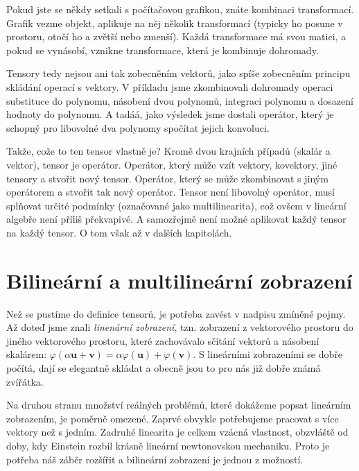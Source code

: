 \documentclass[a5paper,12pt]{amsbook}
\theoremstyle{definition}
\newcommand{\myvec}[1]{\bm{#1}}
\begin{document}
Pokud jste se někdy setkali s počítačovou grafikou, znáte kombinaci transformací. Grafik vezme objekt,
aplikuje na něj několik transformací (typicky ho posune v prostoru, otočí ho a zvětší nebo zmenší).
Každá transformace má svou matici, a pokud se vynásobí, vznikne transformace, která je kombinuje
dohromady.

Tensory tedy nejsou ani tak zobecněním vektorů, jako spíše zobecněním principu skládání operací s vektory.
V příkladu jsme zkombinovali dohromady operaci substituce do polynomu, násobení dvou polynomů, integraci
polynomu a dosazení hodnoty do polynomu. A tadáá, jako výsledek jsme dostali operátor, který je schopný
pro libovolné dva polynomy spočítat jejich konvoluci.

Takže, cože to ten tensor vlastně je? Kromě dvou krajních případů (skalár a vektor), tensor je operátor.
Operátor, který může vzít vektory, kovektory, jiné tensory a stvořit nový tensor. Operátor, který se může
zkombinovat s jiným operátorem a stvořit tak nový operátor. Tensor není libovolný operátor, musí splňovat
určité podmínky (označované jako multilinearita), což ovšem v lineární algebře není příliš překvapivé.
A samozřejmě není možné aplikovat každý tensor na každý tensor. O tom však až v dalších kapitolách.

\section{Bilineární a multilineární zobrazení}

\noindent
Než se pustíme do definice tensorů, je potřeba zavést v nadpisu zmíněné pojmy. Až doteď jsme znali
\textit{linenární zobrazení}, tzn. zobrazení z vektorového prostoru do jiného vektorového prostoru,
které zachovávalo sčítání vektorů a násobení skalárem: $\varphi(\alpha\myvec{u} + \myvec{v}) =
\alpha\varphi(\myvec{u}) + \varphi(\myvec{v})$. S lineárními zobrazeními se dobře počítá, dají se
elegantně skládat a obecně jsou to pro nás již dobře známá zvířátka.

Na druhou stranu množství reálných problémů, které dokážeme popsat lineárním zobrazením, je poměrně
omezené. Zaprvé obvykle potřebujeme pracovat s více vektory než s jedním. Zadruhé linearita je celkem
vzácná vlastnost, obzvláště od doby, kdy Einstein rozbil krásně lineární newtonovskou mechaniku.
Proto je potřeba náš záběr rozšířit a bilineární zobrazení je jednou z možností.
\end{document}
